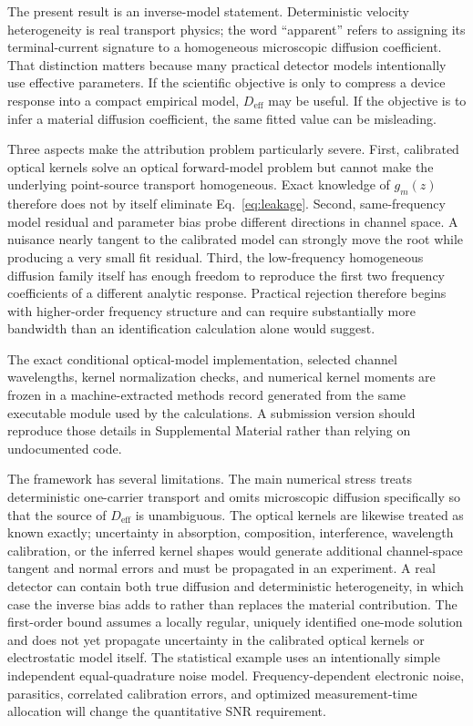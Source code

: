 \documentclass[aps,pra,twocolumn,superscriptaddress,nofootinbib]{revtex4-2}
\newcommand{\Deff}{D_{\mathrm{eff}}}
\begin{document}
The present result is an inverse-model statement. Deterministic velocity heterogeneity is real transport physics; the word ``apparent'' refers to assigning its terminal-current signature to a homogeneous microscopic diffusion coefficient. That distinction matters because many practical detector models intentionally use effective parameters. If the scientific objective is only to compress a device response into a compact empirical model, $\Deff$ may be useful. If the objective is to infer a material diffusion coefficient, the same fitted value can be misleading.

Three aspects make the attribution problem particularly severe. First, calibrated optical kernels solve an optical forward-model problem but cannot make the underlying point-source transport homogeneous. Exact knowledge of $g_m(z)$ therefore does not by itself eliminate Eq.~\eqref{eq:leakage}. Second, same-frequency model residual and parameter bias probe different directions in channel space. A nuisance nearly tangent to the calibrated model can strongly move the root while producing a very small fit residual. Third, the low-frequency homogeneous diffusion family itself has enough freedom to reproduce the first two frequency coefficients of a different analytic response. Practical rejection therefore begins with higher-order frequency structure and can require substantially more bandwidth than an identification calculation alone would suggest.

The exact conditional optical-model implementation, selected channel wavelengths, kernel normalization checks, and numerical kernel moments are frozen in a machine-extracted methods record generated from the same executable module used by the calculations.  A submission version should reproduce those details in Supplemental Material rather than relying on undocumented code.

The framework has several limitations. The main numerical stress treats deterministic one-carrier transport and omits microscopic diffusion specifically so that the source of $\Deff$ is unambiguous.  The optical kernels are likewise treated as known exactly; uncertainty in absorption, composition, interference, wavelength calibration, or the inferred kernel shapes would generate additional channel-space tangent and normal errors and must be propagated in an experiment. A real detector can contain both true diffusion and deterministic heterogeneity, in which case the inverse bias adds to rather than replaces the material contribution. The first-order bound assumes a locally regular, uniquely identified one-mode solution and does not yet propagate uncertainty in the calibrated optical kernels or electrostatic model itself. The statistical example uses an intentionally simple independent equal-quadrature noise model. Frequency-dependent electronic noise, parasitics, correlated calibration errors, and optimized measurement-time allocation will change the quantitative SNR requirement.
\end{document}
